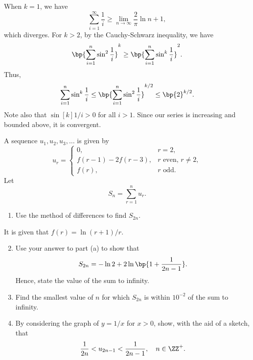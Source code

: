 \begin{solution}
\begin{ppart}
        When $k = 1$, we have \[\sum_{i = 1}^\infty \frac1i \geq \lim_{n \to \infty} \frac2\pi \ln{n+1},\] which diverges. For $k > 2$, by the Cauchy-Schwarz inequality, we have \[\bp{\sum_{i = 1}^n \sin^2 \frac1i}^k \geq \bp{\sum_{i = 1}^n \sin^k \frac1i}^2.\] Thus, \[\sum_{i = 1}^n \sin^k \frac1i \leq \bp{\sum_{i = 1}^n \sin^2 \frac1i}^{k/2} \leq \bp{2}^{k/2}.\] Note also that $\sin[k]{1/i} > 0$ for all $i > 1$. Since our series is increasing and bounded above, it is convergent.
    \end{ppart}
\end{solution}

\begin{problem}
    A sequence $u_1, u_2, u_3, \dots$ is given by \[u_r = \begin{cases}
        0, & r = 2,\\
        f(r-1) - 2f(r-3), & r \text{ even, } r \neq 2,\\
        f(r), & r \text{ odd}.
    \end{cases}\]
    Let \[S_{n} = \sum_{r = 1}^{n} u_r.\]

    \begin{enumerate}
        \item Use the method of differences to find $S_{2n}$.
    \end{enumerate}

    It is given that $f(r) = \ln{(r+1)/r}$.

    \begin{enumerate}
        \setcounter{enumi}{1}
        \item Use your answer to part (a) to show that \[S_{2n} = -\ln 2 + 2\ln \bp{1 + \frac1{2n-1}}.\] Hence, state the value of the sum to infinity.
        \item Find the smallest value of $n$ for which $S_{2n}$ is within $10^{-2}$ of the sum to infinity.
        \item By considering the graph of $y = 1/x$ for $x > 0$, show, with the aid of a sketch, that \[\frac1{2n} < u_{2n-1} < \frac1{2n-1}, \quad n \in \ZZ^+.\]
    \end{enumerate}
\end{problem}
